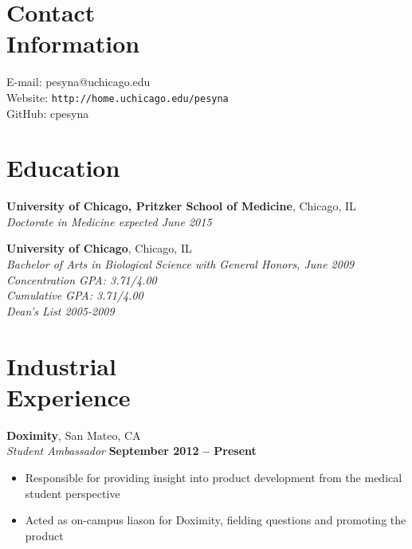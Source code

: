 \documentclass[margin,line]{resume}
\begin{document}
\begin{resume}

    \section{\mysidestyle Contact\\Information}

    E-mail: pesyna@uchicago.edu\\
    Website: \texttt{http://home.uchicago.edu/pesyna}\\
    GitHub: cpesyna \vspace{0mm}

    \section{\mysidestyle Education}
    \textbf{University of Chicago, Pritzker School of Medicine}, Chicago, IL\\%
    \textsl{Doctorate in Medicine expected June 2015}

    \textbf{University of Chicago}, Chicago, IL\\%
    \textsl{Bachelor of Arts in Biological Science with General Honors, June 2009}\\%
    \textsl{Concentration GPA: 3.71/4.00} \\
    \textsl{Cumulative GPA: 3.71/4.00} \\
    \textsl{Dean's List 2005-2009}
    \section{\mysidestyle Industrial\\Experience}
    \textbf{Doximity}, San Mateo, CA\\\vspace{1mm}
    \textsl{Student Ambassador} \hfill \textbf{September 2012 -- Present}
    \begin{itemize}
    \item Responsible for providing insight into product development from the medical student perspective
    \item Acted as on-campus liason for Doximity, fielding questions and promoting the product
    \end{itemize}


\end{resume}
\end{document}
